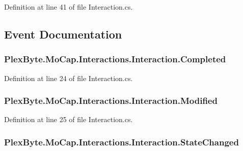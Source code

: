 Definition at line 41 of file Interaction.\+cs.



\subsection{Event Documentation}
\subsubsection[{\texorpdfstring{Completed}{Completed}}]{ Plex\+Byte.\+Mo\+Cap.\+Interactions.\+Interaction.\+Completed}\hypertarget{class_plex_byte_1_1_mo_cap_1_1_interactions_1_1_interaction_a604db07ee0ef778ae93852ddcc9edf55}{}\label{class_plex_byte_1_1_mo_cap_1_1_interactions_1_1_interaction_a604db07ee0ef778ae93852ddcc9edf55}


Definition at line 24 of file Interaction.\+cs.

\subsubsection[{\texorpdfstring{Modified}{Modified}}]{ Plex\+Byte.\+Mo\+Cap.\+Interactions.\+Interaction.\+Modified}\hypertarget{class_plex_byte_1_1_mo_cap_1_1_interactions_1_1_interaction_afdbe5b52f84567a6ef45dab4f963431e}{}\label{class_plex_byte_1_1_mo_cap_1_1_interactions_1_1_interaction_afdbe5b52f84567a6ef45dab4f963431e}


Definition at line 25 of file Interaction.\+cs.

\subsubsection[{\texorpdfstring{State\+Changed}{StateChanged}}]{ Plex\+Byte.\+Mo\+Cap.\+Interactions.\+Interaction.\+State\+Changed}\hypertarget{class_plex_byte_1_1_mo_cap_1_1_interactions_1_1_interaction_acd4488835055291a38a4a79af5266561}{}\label{class_plex_byte_1_1_mo_cap_1_1_interactions_1_1_interaction_acd4488835055291a38a4a79af5266561}


